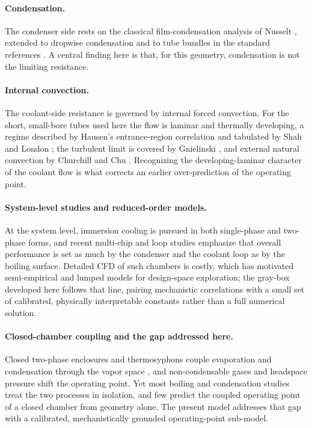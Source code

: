 \documentclass[11pt]{article}
\begin{document}
\paragraph{Condensation.}
The condenser side rests on the classical film-condensation analysis of Nusselt
\cite{nusselt1916}, extended to dropwise condensation \cite{rose2002} and to tube bundles
in the standard references \cite{collier1994}. A central finding here is that, for this
geometry, condensation is not the limiting resistance.

\paragraph{Internal convection.}
The coolant-side resistance is governed by internal forced convection. For the short,
small-bore tubes used here the flow is laminar and thermally developing, a regime
described by Hausen's entrance-region correlation \cite{hausen1943} and tabulated by Shah
and London \cite{shah1978}; the turbulent limit is covered by Gnielinski
\cite{gnielinski1976}, and external natural convection by Churchill and Chu
\cite{churchill1975}. Recognizing the developing-laminar character of the coolant flow is
what corrects an earlier over-prediction of the operating point.

\paragraph{System-level studies and reduced-order models.}
At the system level, immersion cooling is pursued in both single-phase \cite{shrigondekar2023} and
two-phase \cite{wu2025} forms, and recent multi-chip and loop studies emphasize that overall
performance is set as much by the condenser and the coolant loop as by the boiling surface. Detailed
CFD of such chambers is costly, which has motivated semi-empirical and lumped models for design-space
exploration; the gray-box developed here follows that line, pairing mechanistic correlations with a
small set of calibrated, physically interpretable constants rather than a full numerical solution.

\paragraph{Closed-chamber coupling and the gap addressed here.}
Closed two-phase enclosures and thermosyphons couple evaporation and condensation through
the vapor space \cite{faghri1995}, and non-condensable gases and headspace pressure shift
the operating point. Yet most boiling and condensation studies treat the two processes in
isolation, and few predict the coupled operating point of a closed chamber from geometry
alone. The present model addresses that gap with a calibrated, mechanistically grounded
operating-point sub-model.
\end{document}
